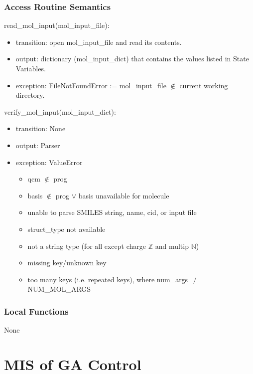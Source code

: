 \documentclass[12pt, titlepage]{article}
\begin{document}
\subsubsection{Access Routine Semantics}

\noindent read\_mol\_input(mol\_input\_file):
\begin{itemize}
	\item transition: open mol\_input\_file and read its contents.
	\item output: dictionary (mol\_input\_dict) that contains the values listed 
	in State Variables.
	\item exception: FileNotFoundError := mol\_input\_file $\notin$ current 
	working directory.
\end{itemize}

\noindent verify\_mol\_input(mol\_input\_dict):
\begin{itemize}
	\item transition: None
	\item output: Parser
	\item exception: ValueError
	\begin{itemize}
		\item qcm $\notin$ prog
		\item basis $\notin$ prog $\lor$ basis unavailable for molecule
		\item unable to parse SMILES string, name, cid, or input file
		\item struct\_type not available
		\item not a string type (for all except charge $\mathbb{Z}$ and multip 
		$\mathbb{N}$)
		\item missing key/unknown key
		\item too many keys (i.e. repeated keys), where num\_args $\neq$ 
		NUM\_MOL\_ARGS
	\end{itemize}
\end{itemize}

\subsubsection{Local Functions}

None

\section{MIS of GA Control} \label{section-gac} 
\end{document}
